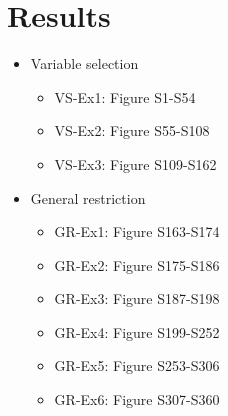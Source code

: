 \documentclass{article}
\begin{document}
\section{Results}
\begin{itemize}
      \item Variable selection
      \begin{itemize}
            \item VS-Ex1: Figure S1-S54
            \item VS-Ex2: Figure S55-S108
            \item VS-Ex3: Figure S109-S162
      \end{itemize}
      \item General restriction
      \begin{itemize}
            \item GR-Ex1: Figure S163-S174
            \item GR-Ex2: Figure S175-S186
            \item GR-Ex3: Figure S187-S198
            \item GR-Ex4: Figure S199-S252
            \item GR-Ex5: Figure S253-S306
            \item GR-Ex6: Figure S307-S360
      \end{itemize}
\end{itemize}

\clearpage



\iffalse
\clearpage 


\fi
\end{document}
